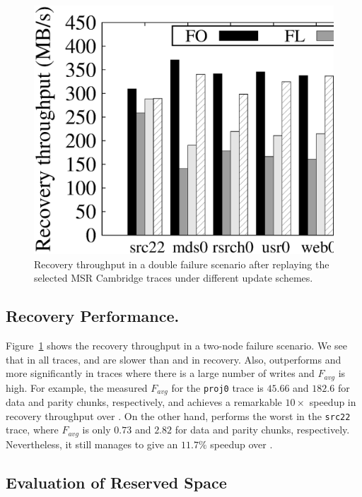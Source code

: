 \begin{figure}[t]
    \centering
    \includegraphics[width=\linewidth]{charts/msr_recovery/eps/msr_recovery}
    \vspace{-12pt}
    \caption{Recovery throughput in a double failure scenario after replaying
        the selected MSR Cambridge traces under different update schemes.}
    \label{fig:msr_recovery}
\end{figure}

\subsection{Recovery Performance.} Figure~\ref{fig:msr_recovery} shows the
recovery throughput in a two-node failure scenario. We see that in all traces,
\FL and \PL are slower than \FO and \PLR in recovery.   Also, \PLR outperforms
\FL and \PL more significantly in traces where there is a large number of
writes and $F_{avg}$ is high.  For example, the measured $F_{avg}$ for the
\texttt{proj0} trace is $45.66$ and $182.6$ for data and parity chunks, 
respectively, and \PLR achieves a remarkable ${10\times}$ speedup in recovery
throughput over \FL.  On the other hand, \PLR performs the worst in the
\texttt{src22} trace, where $F_{avg}$ is only $0.73$ and $2.82$ for data and
parity chunks, respectively.  Nevertheless, it still manages to give an
${11.7}\%$ speedup over \FL.

\subsection{Evaluation of Reserved Space}
\label{eval:reserve_evaluation}

